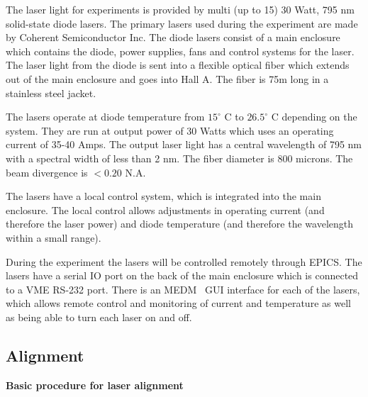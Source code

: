 {The laser light for experiments is provided by multi (up to 15) 30 Watt, 
795 nm solid-state diode lasers.  The primary lasers used during the
experiment are made by Coherent Semiconductor Inc. 
The diode lasers consist of a main enclosure which contains the diode,
power supplies, fans and control systems for the laser.  The laser
light from the diode is sent into a flexible optical fiber which
extends out of the main enclosure and goes into Hall A. 
The fiber is 75m long in a stainless steel jacket.

The lasers operate at diode temperature from $15^{\circ}$ C to
$26.5^{\circ}$ C depending on the system.  They are run at output
power of 30 Watts which uses an operating current of 35-40 Amps.  The
output laser light has a central wavelength of 795 nm with a spectral
width of less than 2 nm. The fiber diameter is 800 microns.  The beam
divergence is $< 0.20$ N.A.

The lasers have a local control system, which is integrated into the
main enclosure.  The local control allows adjustments in operating
current (and therefore the laser power) and diode temperature (and
therefore the wavelength within a small range).

During the experiment the lasers will be controlled remotely through
 EPICS.  The lasers have a serial IO port on the back of the main
 enclosure which is connected to a VME RS-232 port.  There is an
 MEDM~\cite{MEDMwww} GUI interface for each of the lasers, which
 allows remote control and monitoring of current and temperature as
 well as being able to turn each laser on and off.


\subsection{Alignment}

\noindent
{\bf{Basic procedure for laser alignment}}


}
